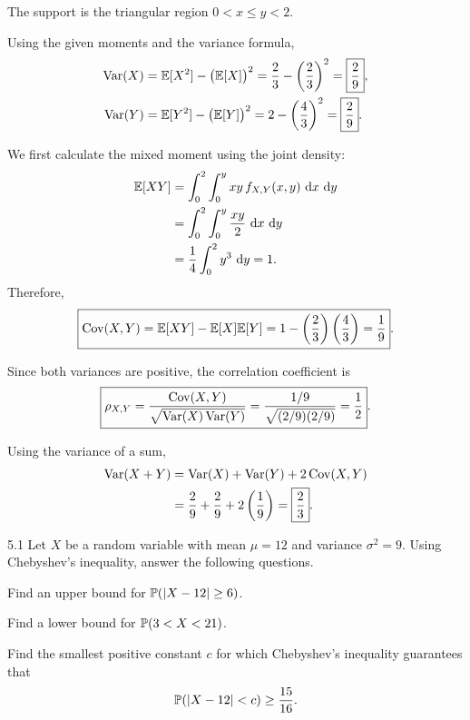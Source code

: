 \documentclass[11pt,oneside]{article}
\begin{document}
\begin{solution}
The support is the triangular region $0<x\leq y<2$.
\begin{problemsubparts}
    \item Using the given moments and the variance formula,
    \[
    \begin{aligned}
        \operatorname{Var}(X)
        &=\mathbb{E}[X^2]-\bigl(\mathbb{E}[X]\bigr)^2
          =\frac23-\left(\frac23\right)^2
          =\boxed{\frac29},\\
        \operatorname{Var}(Y)
        &=\mathbb{E}[Y^2]-\bigl(\mathbb{E}[Y]\bigr)^2
          =2-\left(\frac43\right)^2
          =\boxed{\frac29}.
    \end{aligned}
    \]

    \item We first calculate the mixed moment using the joint density:
    \[
    \begin{aligned}
        \mathbb{E}[XY]
        &=\int_0^2\int_0^y xy\,f_{X,Y}(x,y)\,\mathop{}\!\mathrm{d} x\,\mathop{}\!\mathrm{d} y\\
        &=\int_0^2\int_0^y\frac{xy}{2}\,\mathop{}\!\mathrm{d} x\,\mathop{}\!\mathrm{d} y\\
        &=\frac14\int_0^2y^3\,\mathop{}\!\mathrm{d} y
          =1.
    \end{aligned}
    \]
    Therefore,
    \[
        \boxed{\operatorname{Cov}(X,Y)
        =\mathbb{E}[XY]-\mathbb{E}[X]\mathbb{E}[Y]
        =1-\left(\frac23\right)\left(\frac43\right)
        =\frac19}.
    \]

    \item Since both variances are positive, the correlation coefficient is
    \[
        \boxed{\rho_{X,Y}
        =\frac{\operatorname{Cov}(X,Y)}{\sqrt{\operatorname{Var}(X)\operatorname{Var}(Y)}}
        =\frac{1/9}{\sqrt{(2/9)(2/9)}}
        =\frac12}.
    \]

    \item Using the variance of a sum,
    \[
    \begin{aligned}
        \operatorname{Var}(X+Y)
        &=\operatorname{Var}(X)+\operatorname{Var}(Y)+2\operatorname{Cov}(X,Y)\\
        &=\frac29+\frac29+2\left(\frac19\right)
          =\boxed{\frac23}.
    \end{aligned}
    \]
\end{problemsubparts}
\end{solution}


\begin{problem}{5.1}
Let $X$ be a random variable with mean $\mu=12$ and variance $\sigma^2=9$. Using Chebyshev's inequality, answer the following questions.
\begin{problemsubparts}
\item Find an upper bound for $\mathbb{P}(|X-12|\ge6)$.
\item Find a lower bound for $\mathbb{P}(3<X<21)$.
\item Find the smallest positive constant $c$ for which Chebyshev's inequality guarantees that
\[
\mathbb{P}(|X-12|<c)\ge\frac{15}{16}.
\]
\end{problemsubparts}
\end{problem}
\end{document}
